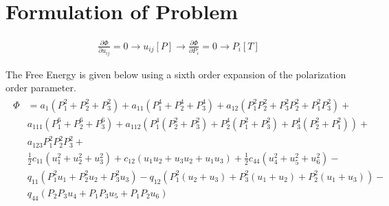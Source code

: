\documentclass{article}
\begin{document}
\linespread{1.1}




\section{Formulation of Problem}
\begin{align}
\frac{\partial \Phi}{\partial u_{ij}}=0 \to u_{ij}[P]\to \frac{\partial \Phi}{\partial P_i}=0 \to P_i[T]
\end{align}

The Free Energy is given below using a sixth order expansion of the polarization order parameter. \\
\begin{align}
\begin{split}\Phi &=a_1 \left(P_1^2+P_2^2+P_3^2\right)+a_{11} \left(P_1^4+P_2^4+P_3^4\right)+a_{12} \left(P_1^2 P_2^2+P_3^2 P_2^2+P_1^2 P_3^2\right)+ \\ 
&a_{111} \left(P_1^6+P_2^6+P_3^6\right)+a_{112} \left( P_1^4\left(P_2^2+P_3^2\right)+P_2^4\left(P_1^2+P_3^2\right)+P_3^4 \left(P_2^2+P_1^2\right)\right)+ \\ 
& a_{123} P_1^2 P_2^2 P_3^2+ \\ 
&\frac{1}{2} c_{11} \left(u_1^2+u_2^2+u_3^2\right)+ c_{12} \left(u_1 u_2+u_3 u_2+u_1 u_3\right)+\frac{1}{2} c_{44} \left(u_4^2+u_5^2+u_6^2\right)- \\ 
& q_{11} \left(P_1^2 u_1+P_2^2 u_2+P_3^2 u_3\right)-q_{12} \left(P_1^2 \left(u_2+u_3\right)+P_3^2 \left(u_1+u_2\right)+P_2^2 \left(u_1+u_3\right)\right)- \\ & q_{44} \left(P_2 P_3 u_4+P_1 P_3 u_5+P_1 P_2 u_6\right) \end{split}
\end{align}
\end{document}
